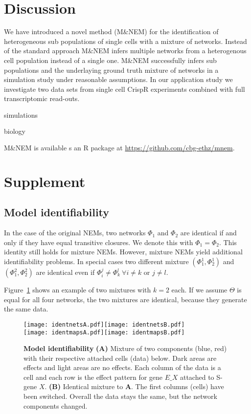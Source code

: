 \documentclass[12pt]{article}
\begin{document}
\section{Discussion}

We have introduced a novel method (M\&NEM) for the identification of heterogeneous sub populations of single cells with a mixture of networks. Instead of the standard approach M\&NEM infers multiple networks from a heterogenous cell population instead of a single one. M\&NEM successfully infers sub populations and the underlaying ground truth mixture of networks in a simulation study under reasonable assumptions. In our application study we investigate two data sets from single cell CrispR experiments combined with full transcriptomic read-outs.

simulations

biology

M\&NEM is available s an R package at \url{https://github.com/cbg-ethz/mnem}.

\section{Supplement}

\subsection{Model identifiability}

In the case of the original NEMs, two networks $\Phi_1$ and $\Phi_2$ are identical if and only if they have equal transitive closures. We denote this with $\Phi_1 = \Phi_2$. This identity still holds for mixture NEMs. However, mixture NEMs yield additional identifiability problems. In special cases two different mixture $(\Phi^1_1, \Phi_2^1)$ and $(\Phi_1^2, \Phi_2^2)$ are identical even if $\Phi_i^j \neq \Phi_k^l ~\forall i \neq k \text{ or } j \neq l$.

Figure~\ref{fig:ident} shows an example of two mixtures with $k=2$ each. If we assume $\Theta$ is equal for all four networks, the two mixtures are identical, because they generate the same data.

\begin{figure}
\begin{center}
\texttt{[image: identnetsA.pdf]}\hspace{2cm}\texttt{[image: identnetsB.pdf]}\\
\texttt{[image: identmapsA.pdf]}\hspace{2cm}\texttt{[image: identmapsB.pdf]}
\caption{\textbf{Model identifiability} \textbf{(A)} Mixture of two components (blue, red) with their respective attached cells (data) below. Dark areas are effects and light areas are no effects. Each column of the data is a cell and each row is the effect pattern for gene $E\_X$ attached to S-gene $X$. \textbf{(B)} Identical mixture to \textbf{A}. The first columns (cells) have been switched. Overall the data stays the same, but the network components changed.}\label{fig:ident}
\end{center}
\end{figure}
\end{document}
